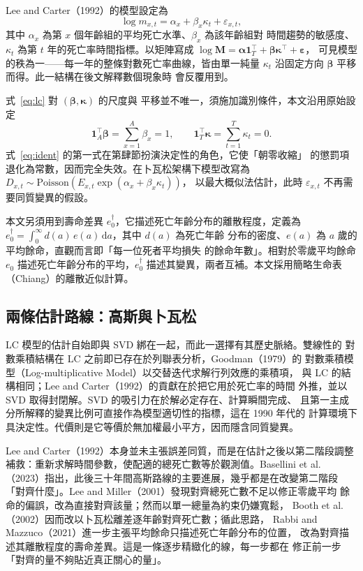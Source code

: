\documentclass[UTF8, fontset=macnew, a4paper, 12pt]{ctexart}
\newcommand{\edag}{e_0^{\dagger}}
\begin{document}
Lee and Carter（1992）的模型設定為
\begin{equation}\label{eq:lc}
\log m_{x,t}=\alpha_x+\beta_x\kappa_t+\varepsilon_{x,t},
\end{equation}
其中 $\alpha_x$ 為第 $x$ 個年齡組的平均死亡水準、$\beta_x$ 為該年齡組對
時間趨勢的敏感度、$\kappa_t$ 為第 $t$ 年的死亡率時間指標。以矩陣寫成
$\log\mathbf{M}=\boldsymbol{\alpha}\mathbf{1}_T^{\!\top}
+\boldsymbol{\beta}\boldsymbol{\kappa}^{\!\top}+\boldsymbol{\varepsilon}$，
可見模型的秩為一——每一年的整條對數死亡率曲線，皆由單一純量 $\kappa_t$
沿固定方向 $\boldsymbol{\beta}$ 平移而得。此一結構在後文解釋數個現象時
會反覆用到。

式~\eqref{eq:lc} 對 $(\boldsymbol{\beta},\boldsymbol{\kappa})$ 的尺度與
平移並不唯一，須施加識別條件，本文沿用原始設定
\begin{equation}\label{eq:ident}
\mathbf{1}_A^{\!\top}\boldsymbol{\beta}=\sum_{x=1}^{A}\beta_x=1,
\qquad
\mathbf{1}_T^{\!\top}\boldsymbol{\kappa}=\sum_{t=1}^{T}\kappa_t=0 .
\end{equation}
式~\eqref{eq:ident} 的第一式在第肆節扮演決定性的角色，它使「朝零收縮」
的懲罰項退化為常數，因而完全失效。在卜瓦松架構下模型改寫為
$D_{x,t}\sim\text{Poisson}\!\left(E_{x,t}\exp(\alpha_x+\beta_x\kappa_t)\right)$，
以最大概似法估計，此時 $\varepsilon_{x,t}$ 不再需要同質變異的假設。

本文另須用到壽命差異 $\edag$，它描述死亡年齡分布的離散程度，定義為
$\edag=\int_0^{\infty} d(a)\,e(a)\,\mathrm{d}a$，其中 $d(a)$ 為死亡年齡
分布的密度、$e(a)$ 為 $a$ 歲的平均餘命，直觀而言即「每一位死者平均損失
的餘命年數」。相對於零歲平均餘命 $e_0$ 描述死亡年齡分布的平均，$\edag$
描述其變異，兩者互補。本文採用簡略生命表（Chiang）的離散近似計算。


\subsection{兩條估計路線：高斯與卜瓦松}\label{sec:routes}

LC 模型的估計自始即與 SVD 綁在一起，而此一選擇有其歷史脈絡。雙線性的
對數乘積結構在 LC 之前即已存在於列聯表分析，Goodman（1979）的
對數乘積模型（Log-multiplicative Model）以交替迭代求解行列效應的乘積項，
與 LC 的結構相同；Lee and Carter（1992）的貢獻在於把它用於死亡率的時間
外推，並以 SVD 取得封閉解。SVD 的吸引力在於解必定存在、計算瞬間完成、
且第一主成分所解釋的變異比例可直接作為模型適切性的指標，這在 1990 年代的
計算環境下具決定性。代價則是它等價於無加權最小平方，因而隱含同質變異。

Lee and Carter（1992）本身並未主張誤差同質，而是在估計之後以第二階段調整
補救：重新求解時間參數，使配適的總死亡數等於觀測值。Basellini et al.
（2023）指出，此後三十年間高斯路線的主要進展，幾乎都是在改變第二階段
「對齊什麼」。Lee and Miller（2001）發現對齊總死亡數不足以修正零歲平均
餘命的偏誤，改為直接對齊該量；然而以單一總量為約束仍嫌寬鬆，
Booth et al.（2002）因而改以卜瓦松離差逐年齡對齊死亡數；循此思路，
Rabbi and Mazzuco（2021）進一步主張平均餘命只描述死亡年齡分布的位置，
改為對齊描述其離散程度的壽命差異。這是一條逐步精緻化的線，每一步都在
修正前一步「對齊的量不夠貼近真正關心的量」。
\end{document}
